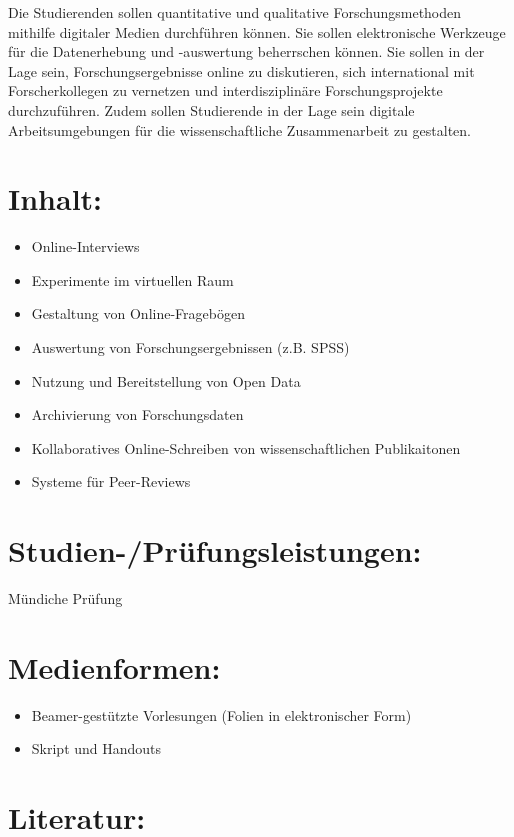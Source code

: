 Die Studierenden sollen quantitative und qualitative Forschungsmethoden
mithilfe digitaler Medien durchführen können. Sie sollen elektronische
Werkzeuge für die Datenerhebung und -auswertung beherrschen können. Sie
sollen in der Lage sein, Forschungsergebnisse online zu diskutieren,
sich international mit Forscherkollegen zu vernetzen und
interdisziplinäre Forschungsprojekte durchzuführen. Zudem sollen
Studierende in der Lage sein digitale Arbeitsumgebungen für die
wissenschaftliche Zusammenarbeit zu gestalten.

\section*{Inhalt:}\label{inhalt-14}

\begin{itemize}
\tightlist
\item
  Online-Interviews
\item
  Experimente im virtuellen Raum
\item
  Gestaltung von Online-Fragebögen
\item
  Auswertung von Forschungsergebnissen (z.B. SPSS)
\item
  Nutzung und Bereitstellung von Open Data
\item
  Archivierung von Forschungsdaten
\item
  Kollaboratives Online-Schreiben von wissenschaftlichen Publikaitonen
\item
  Systeme für Peer-Reviews
\end{itemize}

\section*{Studien-/Prüfungsleistungen:}\label{studien-pruxfcfungsleistungen-14}

Mündiche Prüfung

\section*{Medienformen:}\label{medienformen-14}

\begin{itemize}
\tightlist
\item
  Beamer-gestützte Vorlesungen (Folien in elektronischer Form)
\item
  Skript und Handouts
\end{itemize}

\section*{Literatur:}\label{literatur-14}

